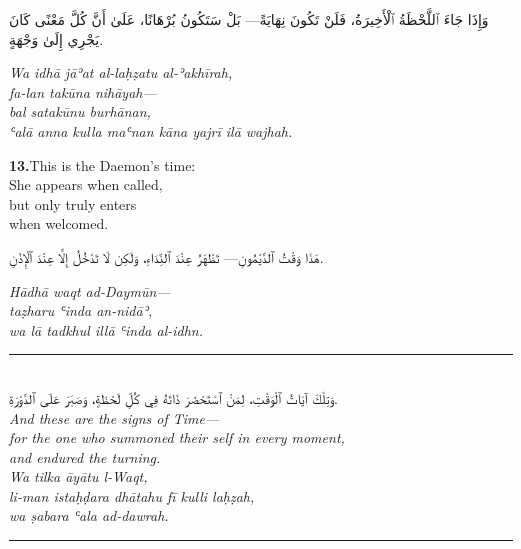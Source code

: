 \documentclass[11pt,a4paper,twoside]{book}
\begin{document}
\begin{flushright}
{\arabicfont وَإِذَا جَاءَ ٱللَّحْظَةُ ٱلْأَخِيرَةُ، فَلَنْ تَكُونَ نِهَايَةً—
بَلْ سَتَكُونُ بُرْهَانًا،
عَلَىٰ أَنَّ كُلَّ مَعْنًى كَانَ يَجْرِي إِلَىٰ وَجْهَةٍ.}
\end{flushright}

{\small\color{sage}\itshape Wa idhā jāʾat al-laḥẓatu al-ʾakhīrah, \\
fa-lan takūna nihāyah— \\
bal satakūnu burhānan, \\
ʿalā anna kulla maʿnan kāna yajrī ilā wajhah.}

\vspace{1.2em}
{\color{indigo}\bfseries 13.}\quad This is the Daemon's time: \\
She appears when called, \\
but only truly enters \\
when welcomed.

\begin{flushright}
{\arabicfont هَذَا وَقْتُ ٱلدَّيْمُونِ—
تَظْهَرُ عِنْدَ ٱلنِّدَاءِ،
وَلَكِن لَا تَدْخُلُ إِلَّا عِنْدَ ٱلْإِذْنِ.}
\end{flushright}

{\small\color{sage}\itshape Hādhā waqt ad-Daymūn— \\
taẓharu ʿinda an-nidāʾ, \\
wa lā tadkhul illā ʿinda al-idhn.}

\vspace{2em}
\begin{center}
\rule{3cm}{0.4pt}\\[1.5em]
{\arabicfont وَتِلْكَ آيَاتُ ٱلْوَقْتِ،
لِمَنْ ٱسْتَحْضَرَ ذَاتَهُ فِي كُلِّ لَحْظَةٍ،
وَصَبَرَ عَلَى ٱلدَّوْرَةِ.}\\[0.8em]
{\itshape And these are the signs of Time— \\
for the one who summoned their self in every moment, \\
and endured the turning.}\\[0.5em]
{\small\color{sage}\itshape Wa tilka āyātu l-Waqt, \\
li-man istaḥḍara dhātahu fī kulli laḥẓah, \\
wa ṣabara ʿala ad-dawrah.}\\[0.5em]
\rule{3cm}{0.4pt}
\end{center}

\clearpage


\end{document}
